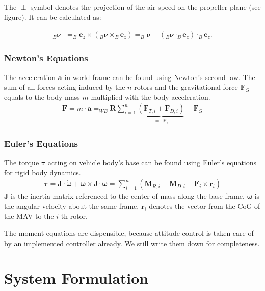 The $\perp$-symbol denotes the projection of the air speed on the propeller plane (see figure). It can be calculated as:

\begin{align}
_B\mathbf{\boldsymbol{\nu}}^\perp = _B\mathbf{e}_z \times (_B\mathbf{\boldsymbol{\nu}} \times _B\mathbf{e}_z) = _B\mathbf{\boldsymbol{\nu}} - ( _B\mathbf{\boldsymbol{\nu}} \cdot _B\mathbf{e}_z) \cdot _B\mathbf{e}_z .
\end{align}

\subsubsection{Newton's Equations}
The acceleration $\mathbf{a}$ in world frame can be found using Newton's second law. The sum of all forces acting induced by the $n$ rotors and the gravitational force $\mathbf{F}_G$ equals to the body mass $m$ multiplied with the body acceleration.
\begin{align}
\mathbf{F} = m \cdot \mathbf{a} = _{WB}\mathbf{R} \sum_{i=1}^n \underbrace{\left(\mathbf{F}_{T,i} + \mathbf{F}_{D,i} \right)}_{=:\mathbf{F}_i} + \mathbf{F}_G \label{eq:newton}
\end{align}

\subsubsection{Euler's Equations}
The torque $\boldsymbol{\tau}$ acting on vehicle body's base can be found using Euler's equations for rigid body dynamics.  
\begin{align}
\boldsymbol{\tau} = \mathbf{J} \cdot  \mathbf{\dot{\boldsymbol{\omega}}} + \boldsymbol{\omega} \times \mathbf{J} \cdot \boldsymbol{\omega} = \sum_{i=1}^n \left( \mathbf{M}_{R,i}+ \mathbf{M}_{D,i} + \mathbf{F}_i \times \mathbf{r}_i \right)  \label{eq:euler}
\end{align}
$\mathbf{J}$  is the inertia matrix referenced to the center of mass along the base frame. $\boldsymbol{\omega}$ is the angular velocity about the same frame. $\mathbf{r}_i$ denotes the vector from the CoG of the MAV to the $i$-th rotor.

The moment equations are dispensible, because attitude control is taken care of by an implemented controller already. We still write them down for completeness.

\section{System Formulation}
